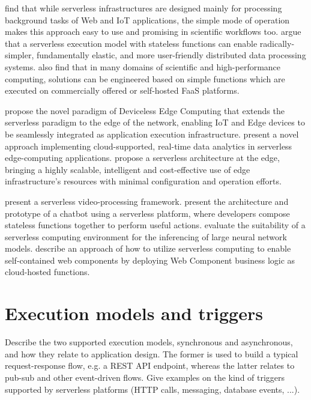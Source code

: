 \documentclass[utf8,english]{gradu3}
\begin{document}
\textcite{malawski17executescientific} find that while serverless infrastructures are designed mainly for processing background tasks of Web and IoT applications, the simple mode of operation makes this approach easy to use and promising in scientific workflows too. \textcite{jonas17occupy} argue that a serverless execution model with stateless functions can enable radically-simpler, fundamentally elastic, and more user-friendly distributed data processing systems. \textcite{spillner18faaster} also find that in many domains of scientific and high-performance computing, solutions can be engineered based on simple functions which are executed on commercially offered or self-hosted FaaS platforms.

\textcite{glikson17devicelessedge} propose the novel paradigm of Deviceless Edge Computing that extends the serverless paradigm to the edge of the network, enabling IoT and Edge devices to be seamlessly integrated as application execution infrastructure. \textcite{nastic17analyticsedge} present a novel approach implementing cloud-supported, real-time data analytics in serverless edge-computing applications. \textcite{baresi17edgecomputing} propose a serverless architecture at the edge, bringing a highly scalable, intelligent and cost-effective use of edge infrastructure’s resources with minimal configuration and operation efforts.

\textcite{fouladi2017encoding} present a serverless video-processing framework. \textcite{yan16chatbot} present the architecture and prototype of a chatbot using a serverless platform, where developers compose stateless functions together to perform useful actions. \textcite{ishakian17neural} evaluate the suitability of a serverless computing environment for the inferencing of large neural network models. \textcite{ast17webcomponent} describe an approach of how to utilize serverless computing to enable self-contained web components by deploying Web Component business logic as cloud-hosted functions.

\section{Execution models and triggers}

Describe the two supported execution models, synchronous and asynchronous, and how they relate to application design. The former is used to build a typical request-response flow, e.g. a REST API endpoint, whereas the latter relates to pub-sub and other event-driven flows. Give examples on the kind of triggers supported by serverless platforms (HTTP calls, messaging, database events, ...).
\end{document}
